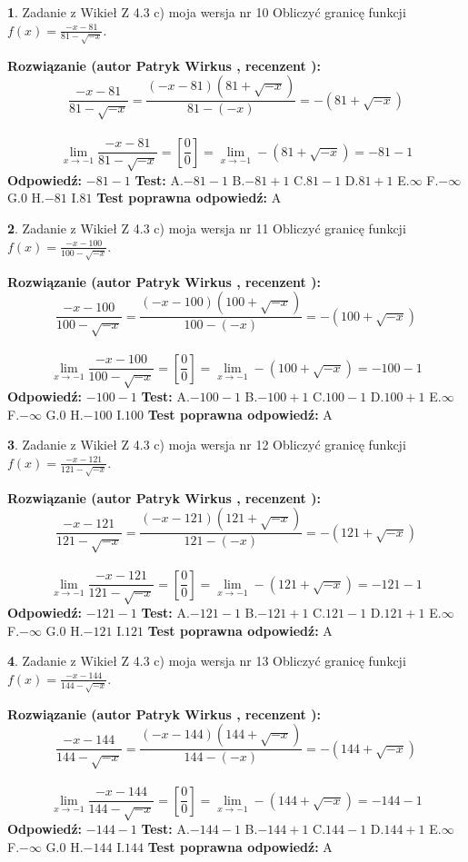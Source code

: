\documentclass[12pt, a4paper]{article}
\theoremstyle{definition} %
\newtheorem{zad}{}
\newcommand{\zadStart}[1]{\begin{zad}#1\newline}
\newcommand{\zadStop}{\end{zad}}
\newcommand{\rozwStart}[2]{\noindent \textbf{Rozwiązanie (autor #1 , recenzent #2): }\newline}
\newcommand{\rozwStop}{\newline}
\newcommand{\odpStart}{\noindent \textbf{Odpowiedź:}\newline}
\newcommand{\odpStop}{\newline}
\newcommand{\testStart}{\noindent \textbf{Test:}\newline}
\newcommand{\testStop}{\newline}
\newcommand{\kluczStart}{\noindent \textbf{Test poprawna odpowiedź:}\newline}
\newcommand{\kluczStop}{\newline}
\begin{document}
\zadStart{Zadanie z Wikieł Z 4.3 c) moja wersja nr 10}
Obliczyć granicę funkcji $f(x)=\frac{-x-81}{81-\sqrt{-x}}$.
\zadStop
\rozwStart{Patryk Wirkus}{}
$$\frac{-x-81}{81-\sqrt{-x}}=\frac{(-x-81)(81+\sqrt{-x})}{81-(-x)}=-(81+\sqrt{-x})$$
\\
$$\lim\limits_{x\to-1}\frac{-x-81}{81-\sqrt{-x}}=[\frac{0}{0}]=\lim\limits_{x\to-1}-(81+\sqrt{-x}) =-81-1$$
\rozwStop
\odpStart
$-81-1$
\odpStop
\testStart
A.$-81-1$
B.$-81+1$
C.$81-1$
D.$81+1$
E.$\infty$
F.$-\infty$
G.$0$
H.$-81$
I.$81$
\testStop
\kluczStart
A
\kluczStop



\zadStart{Zadanie z Wikieł Z 4.3 c) moja wersja nr 11}
Obliczyć granicę funkcji $f(x)=\frac{-x-100}{100-\sqrt{-x}}$.
\zadStop
\rozwStart{Patryk Wirkus}{}
$$\frac{-x-100}{100-\sqrt{-x}}=\frac{(-x-100)(100+\sqrt{-x})}{100-(-x)}=-(100+\sqrt{-x})$$
\\
$$\lim\limits_{x\to-1}\frac{-x-100}{100-\sqrt{-x}}=[\frac{0}{0}]=\lim\limits_{x\to-1}-(100+\sqrt{-x}) =-100-1$$
\rozwStop
\odpStart
$-100-1$
\odpStop
\testStart
A.$-100-1$
B.$-100+1$
C.$100-1$
D.$100+1$
E.$\infty$
F.$-\infty$
G.$0$
H.$-100$
I.$100$
\testStop
\kluczStart
A
\kluczStop



\zadStart{Zadanie z Wikieł Z 4.3 c) moja wersja nr 12}
Obliczyć granicę funkcji $f(x)=\frac{-x-121}{121-\sqrt{-x}}$.
\zadStop
\rozwStart{Patryk Wirkus}{}
$$\frac{-x-121}{121-\sqrt{-x}}=\frac{(-x-121)(121+\sqrt{-x})}{121-(-x)}=-(121+\sqrt{-x})$$
\\
$$\lim\limits_{x\to-1}\frac{-x-121}{121-\sqrt{-x}}=[\frac{0}{0}]=\lim\limits_{x\to-1}-(121+\sqrt{-x}) =-121-1$$
\rozwStop
\odpStart
$-121-1$
\odpStop
\testStart
A.$-121-1$
B.$-121+1$
C.$121-1$
D.$121+1$
E.$\infty$
F.$-\infty$
G.$0$
H.$-121$
I.$121$
\testStop
\kluczStart
A
\kluczStop



\zadStart{Zadanie z Wikieł Z 4.3 c) moja wersja nr 13}
Obliczyć granicę funkcji $f(x)=\frac{-x-144}{144-\sqrt{-x}}$.
\zadStop
\rozwStart{Patryk Wirkus}{}
$$\frac{-x-144}{144-\sqrt{-x}}=\frac{(-x-144)(144+\sqrt{-x})}{144-(-x)}=-(144+\sqrt{-x})$$
\\
$$\lim\limits_{x\to-1}\frac{-x-144}{144-\sqrt{-x}}=[\frac{0}{0}]=\lim\limits_{x\to-1}-(144+\sqrt{-x}) =-144-1$$
\rozwStop
\odpStart
$-144-1$
\odpStop
\testStart
A.$-144-1$
B.$-144+1$
C.$144-1$
D.$144+1$
E.$\infty$
F.$-\infty$
G.$0$
H.$-144$
I.$144$
\testStop
\kluczStart
A
\kluczStop
\end{document}
